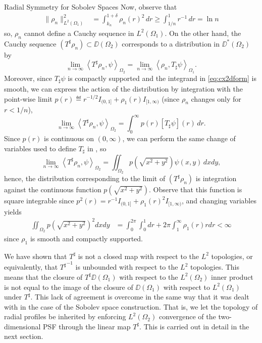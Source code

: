 \begin{chapter}{Radial Symmetry for Sobolev Spaces}
Now, observe that
\begin{align}
  \|\rho_n\|_{L^2(\Omega_1)}^2 
    &= \int_{k_n}^{1+\delta} \rho_n(r)^2\,dr \ge \int_{1/n}^1 r^{-1}\,dr = \ln n 
\end{align}
so, $\rho_n$ cannot define a Cauchy sequence in $L^2(\Omega_1)$.
On the other hand, the Cauchy sequence $(T^\sharp \rho_n) \subset \DD(\Omega_2)$ corresponds to a distribution in $\DD^*(\Omega_2)$ by
\begin{equation} \label{eq:cx2dform}
  \lim_{n\to\infty}\left\langle T^\sharp \rho_n,\psi \right\rangle_{\Omega_2} 
  = \lim_{n\to\infty}\left\langle \rho_n,T_\sharp \psi \right\rangle_{\Omega_1}.
\end{equation}
Moreover, since $T_\sharp \psi$ is compactly supported and the integrand in \eqref{eq:cx2dform} is smooth, we can express the action of the distribution by integration with the point-wise limit $p(r) \eqdef r^{-1/2}I_{(0,1]} + \rho_1(r)I_{[1,\infty)}$ (since $\rho_n$ changes only for $r<1/n$),
\begin{equation}
  \lim_{n\to\infty}\left\langle T^\sharp \rho_n,\psi \right\rangle_{\Omega_2} = \int_0^\infty p(r)[T_\sharp \psi](r)\,dr.
\end{equation}
Since $p(r)$ is continuous on $(0,\infty)$, we can perform the same change of variables used to define $T_\sharp$ in , so 
\begin{equation}
  \lim_{n\to\infty}\left\langle T^\sharp \rho_n,\psi \right\rangle_{\Omega_2} = \iint_{\Omega_2} p\left(\sqrt{x^2+y^2}\right)\psi(x,y)\,dxdy,
\end{equation}
hence, the distribution corresponding to the limit of $(T^\sharp \rho_n)$ is integration against the continuous function $p\left(\sqrt{x^2+y^2}\right)$.
Observe that this function is square integrable since $p^2(r) = r^{-1}I_{(0,1]} + \rho_1(r)^2I_{[1,\infty)}$, and changing variables yields
\begin{align}
  \iint_{\Omega_2} p\left(\sqrt{x^2+y^2}\right)^2 dxdy 
  &= \int_0^{2\pi}\int_0^1dr + 2\pi \int_1^\infty \rho_1(r)rdr <\infty
\end{align} 
since $\rho_1$ is smooth and compactly supported.

We have shown that $T^\sharp$ is not a closed map with respect to the $L^2$ topologies, or equivalently, that ${T^\sharp}^{-1}$ is unbounded with respect to the $L^2$ topologies.
This means that the closure of $T^\sharp \DD(\Omega_1)$ with respect to the $L^2(\Omega_2)$ inner product is not equal to the image of the closure of $\DD(\Omega_1)$ with respect to $L^2(\Omega_1)$ under $T^\sharp$. 
This lack of agreement is overcome in the same way that it was dealt with in the case of the Sobolev space construction.
That is, we let the topology of radial profiles be inherited by enforcing $L^2(\Omega_2)$ convergence of the two-dimensional PSF through the linear map $T^\sharp$.
This is carried out in detail in the next section.


\end{chapter}
